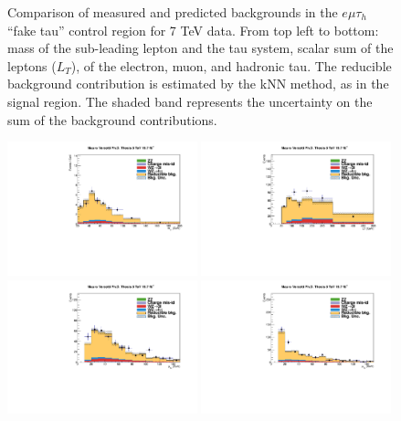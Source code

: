 \begin{figure}
\begin{center}
  \caption{Comparison of measured and predicted backgrounds in the $e\mu\tau_h$ ``fake tau'' control region for 7 TeV data.
  From top left to bottom: mass of the sub-leading lepton and the tau system, scalar sum of the leptons \pT ($L_T$), \pT of the electron, muon, and hadronic tau.
  The reducible background contribution is estimated by the kNN method, as in the signal region.
  The shaded band represents the uncertainty on the sum of the background contributions.
  }
  \label{fig:LLT_emt_f3_control_7TeV}
\end{center}
\end{figure}

\begin{figure}
\begin{center}
  \includegraphics[width=0.49\textwidth]{4_Analisys/pics/8TeV/plots/emt/f3/Full/final-f3-subMass-Full.pdf}
  \includegraphics[width=0.49\textwidth]{4_Analisys/pics/8TeV/plots/emt/f3/final-f3-LT.pdf}\\
  \includegraphics[width=0.49\textwidth]{4_Analisys/pics/8TeV/plots/emt/f3/Full/final-f3-ePt-Full.pdf}
  \includegraphics[width=0.49\textwidth]{4_Analisys/pics/8TeV/plots/emt/f3/Full/final-f3-mPt-Full.pdf}\\

\end{center}
\end{figure}
